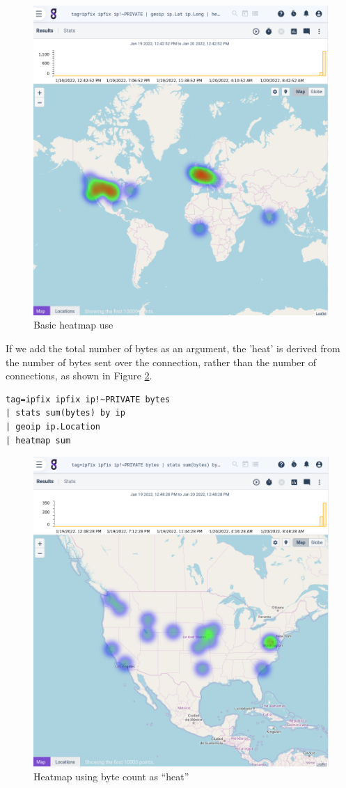 \begin{figure}
	\includegraphics[width=0.6\linewidth]{images/heatmap-basic.png}
	\caption{Basic heatmap use}
	\label{fig:heatmap-basic}
\end{figure}

If we add the total number of bytes as an argument, the 'heat' is
derived from the number of bytes sent over the connection, rather than
the number of connections, as shown in Figure \ref{fig:heatmap-bytes}.

\begin{Verbatim}[breaklines=true]
tag=ipfix ipfix ip!~PRIVATE bytes 
| stats sum(bytes) by ip 
| geoip ip.Location 
| heatmap sum
\end{Verbatim}

\begin{figure}
	\includegraphics[width=0.6\linewidth]{images/heatmap-bytes.png}
	\caption{Heatmap using byte count as ``heat''}
	\label{fig:heatmap-bytes}
\end{figure}

